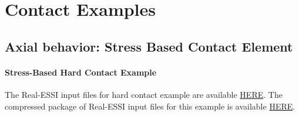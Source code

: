 







\clearpage
\newpage
\section{Contact Examples}
\label{Contact_Examples}
\subsection{ Axial behavior: Stress Based Contact Element}


\paragraph{Stress-Based Hard Contact Example}
The Real-ESSI input files for hard contact example are available 
\href{http://sokocalo.engr.ucdavis.edu/~jeremic/lecture_notes_online_material/_Chapter_Short_Course_Examples/Day3/Contact_Examples/axial/HardContact_Elastic_Perfectly_Plastic_Shear_Model}{HERE}. 
The compressed package of Real-ESSI input files for this example is available 
\href{http://sokocalo.engr.ucdavis.edu/~jeremic/lecture_notes_online_material/_Chapter_Short_Course_Examples/Day3/Contact_Examples/axial/HardContact_Elastic_Perfectly_Plastic_Shear_Model/_all_files_packaged_for_HardContact_Elastic_Perfectly_Plastic_Shear_Model.tar.gz}{HERE}. 

